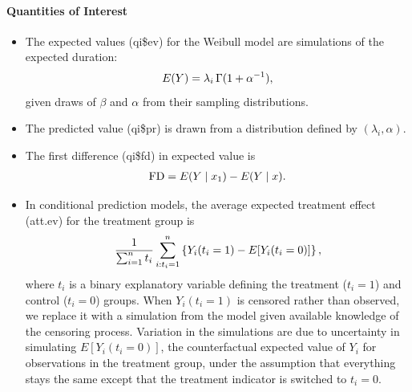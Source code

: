 \documentclass[letterpaper,10pt,english]{sphinxmanual}
\begin{document}
\paragraph{Quantities of Interest}
\label{zelig-weibull:quantities-of-interest}\begin{itemize}
\item {} 
The expected values (qi\$ev) for the Weibull model are simulations of
the expected duration:
\begin{gather}
\begin{split}E(Y) = \lambda_i \, \Gamma (1 + \alpha^{-1}),\end{split}\notag
\end{gather}
given draws of \(\beta\) and \(\alpha\) from their sampling
distributions.

\item {} 
The predicted value (qi\$pr) is drawn from a distribution defined by
\((\lambda_i, \alpha)\).

\item {} 
The first difference (qi\$fd) in expected value is
\begin{gather}
\begin{split}\textrm{FD} = E(Y \mid x_1) - E(Y \mid x).\end{split}\notag
\end{gather}
\item {} 
In conditional prediction models, the average expected treatment
effect (att.ev) for the treatment group is
\begin{gather}
\begin{split}\frac{1}{\sum_{i=1}^n t_i}\sum_{i:t_i=1}^n \left\{ Y_i(t_i=1) -
      E[Y_i(t_i=0)] \right\},\end{split}\notag
\end{gather}
where \(t_i\) is a binary explanatory variable defining the
treatment (\(t_i=1\)) and control (\(t_i=0\)) groups. When
\(Y_i(t_i=1)\) is censored rather than observed, we replace it
with a simulation from the model given available knowledge of the
censoring process. Variation in the simulations are due to
uncertainty in simulating \(E[Y_i(t_i=0)]\), the counterfactual
expected value of \(Y_i\) for observations in the treatment
group, under the assumption that everything stays the same except
that the treatment indicator is switched to \(t_i=0\).


\end{itemize}
\end{document}
